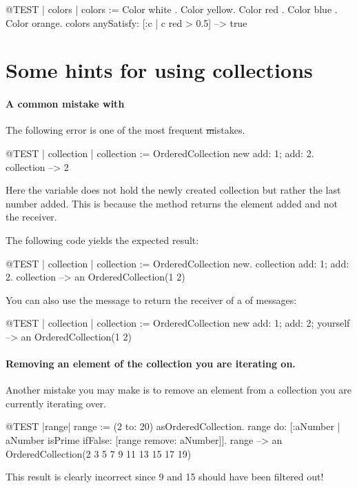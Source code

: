 \documentclass[a4paper,10pt,twoside]{book}
\begin{document}
\begin{code}{@TEST | colors | colors := {Color white . Color yellow. Color red . Color blue . Color orange}.}
colors anySatisfy: [:c | c red > 0.5] --> true
\end{code}

\section{Some hints for using collections}

\paragraph{A common mistake with }
The following error is one of the most frequent \st mistakes.

\begin{code}{@TEST | collection | }
collection := OrderedCollection new add: 1; add: 2.
collection --> 2
\end{code}
\noindent
Here the variable  does not hold the newly created collection but rather the last number added. 
This is because the method  returns the element added and not the receiver.

The following code yields the expected result:
\begin{code}{@TEST | collection |}
collection := OrderedCollection new.
collection add: 1; add: 2.
collection --> an OrderedCollection(1 2)
\end{code}

You can also use the message  to return the receiver of a  of messages:

\begin{code}{@TEST | collection |}
collection := OrderedCollection new add: 1; add: 2; yourself --> an OrderedCollection(1 2)
\end{code}

\paragraph{Removing an element of the collection you are iterating on.}
Another mistake you may make is to remove an element from a collection you are currently iterating over.
\begin{code}{@TEST |range|}
range := (2 to: 20) asOrderedCollection.
range do: [:aNumber | aNumber isPrime ifFalse: [range remove: aNumber]].
range --> an OrderedCollection(2 3 5 7 9 11 13 15 17 19)
\end{code}
\noindent
This result is clearly incorrect since 9 and 15 should have been filtered out!
\end{document}
